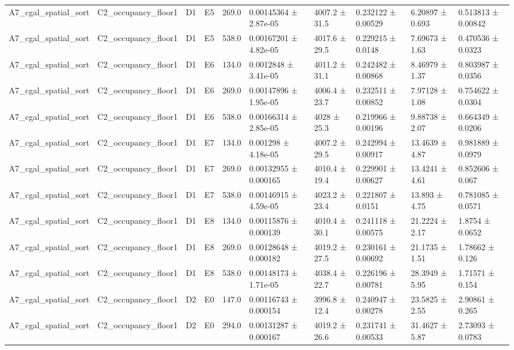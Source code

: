 \begin{table}
\begin{tabular}{llllllllll}
A7\_cgal\_spatial\_sort & C2\_occupancy\_floor1 & D1 & E5 & 269.0 & 0.00145364 ± 2.87e-05 & 4007.2 ± 31.5 & 0.232122 ± 0.00529 & 6.20897 ± 0.693 & 0.513813 ± 0.00842 \\
A7\_cgal\_spatial\_sort & C2\_occupancy\_floor1 & D1 & E5 & 538.0 & 0.00167201 ± 4.82e-05 & 4017.6 ± 29.5 & 0.229215 ± 0.0148 & 7.69673 ± 1.63 & 0.470536 ± 0.0323 \\
A7\_cgal\_spatial\_sort & C2\_occupancy\_floor1 & D1 & E6 & 134.0 & 0.0012848 ± 3.41e-05 & 4011.2 ± 31.1 & 0.242482 ± 0.00868 & 8.46979 ± 1.37 & 0.803987 ± 0.0356 \\
A7\_cgal\_spatial\_sort & C2\_occupancy\_floor1 & D1 & E6 & 269.0 & 0.00147896 ± 1.95e-05 & 4006.4 ± 23.7 & 0.232511 ± 0.00852 & 7.97128 ± 1.08 & 0.754622 ± 0.0304 \\
A7\_cgal\_spatial\_sort & C2\_occupancy\_floor1 & D1 & E6 & 538.0 & 0.00166314 ± 2.85e-05 & 4028 ± 25.3 & 0.219966 ± 0.00196 & 9.88738 ± 2.07 & 0.664349 ± 0.0206 \\
A7\_cgal\_spatial\_sort & C2\_occupancy\_floor1 & D1 & E7 & 134.0 & 0.001298 ± 4.18e-05 & 4007.2 ± 29.5 & 0.242994 ± 0.00917 & 13.4639 ± 4.87 & 0.981889 ± 0.0979 \\
A7\_cgal\_spatial\_sort & C2\_occupancy\_floor1 & D1 & E7 & 269.0 & 0.00132955 ± 0.000165 & 4010.4 ± 19.4 & 0.229901 ± 0.00627 & 13.4241 ± 4.61 & 0.852606 ± 0.067 \\
A7\_cgal\_spatial\_sort & C2\_occupancy\_floor1 & D1 & E7 & 538.0 & 0.00146915 ± 4.59e-05 & 4023.2 ± 23.4 & 0.221807 ± 0.0151 & 13.893 ± 4.75 & 0.781085 ± 0.0571 \\
A7\_cgal\_spatial\_sort & C2\_occupancy\_floor1 & D1 & E8 & 134.0 & 0.00115876 ± 0.000139 & 4010.4 ± 30.1 & 0.241118 ± 0.00575 & 21.2224 ± 2.17 & 1.8754 ± 0.0652 \\
A7\_cgal\_spatial\_sort & C2\_occupancy\_floor1 & D1 & E8 & 269.0 & 0.00128648 ± 0.000182 & 4019.2 ± 27.5 & 0.230161 ± 0.00692 & 21.1735 ± 1.51 & 1.78662 ± 0.126 \\
A7\_cgal\_spatial\_sort & C2\_occupancy\_floor1 & D1 & E8 & 538.0 & 0.00148173 ± 1.71e-05 & 4038.4 ± 22.7 & 0.226196 ± 0.00781 & 28.3949 ± 5.95 & 1.71571 ± 0.154 \\
A7\_cgal\_spatial\_sort & C2\_occupancy\_floor1 & D2 & E0 & 147.0 & 0.00116743 ± 0.000154 & 3996.8 ± 12.4 & 0.240947 ± 0.00278 & 23.5825 ± 2.55 & 2.90861 ± 0.265 \\
A7\_cgal\_spatial\_sort & C2\_occupancy\_floor1 & D2 & E0 & 294.0 & 0.00131287 ± 0.000167 & 4019.2 ± 26.6 & 0.231741 ± 0.00533 & 31.4627 ± 5.87 & 2.73093 ± 0.0783 \\

\end{tabular}
\end{table}
